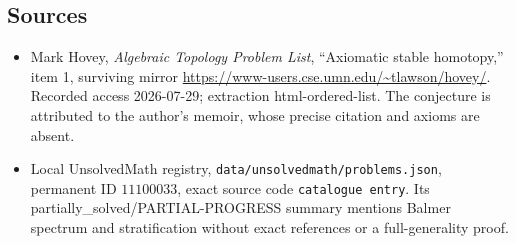 \documentclass[11pt]{article}
\begin{document}
\subsection{Sources}
\begin{itemize}
\item Mark Hovey, \emph{Algebraic Topology Problem List}, ``Axiomatic stable homotopy,'' item 1, surviving mirror \url{https://www-users.cse.umn.edu/~tlawson/hovey/}. Recorded access 2026-07-29; extraction html-ordered-list. The conjecture is attributed to the author's memoir, whose precise citation and axioms are absent.
\item Local UnsolvedMath registry, \texttt{data/unsolvedmath/problems.json}, permanent ID \(11100033\), exact source code \texttt{catalogue entry}. Its partially\_solved/PARTIAL-PROGRESS summary mentions Balmer spectrum and stratification without exact references or a full-generality proof.
\end{itemize}
\end{document}
